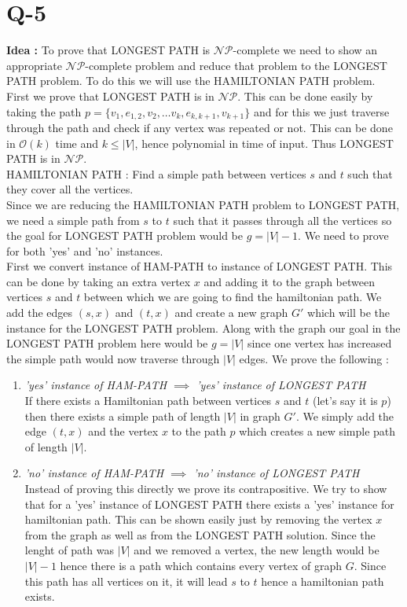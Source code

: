 \documentclass[14pt]{article}
\newcommand{\nonp}{$\mathcal{NP}$}
\begin{document}
 	\section*{Q-5}
 		\noindent
 		\textbf{Idea : }To prove that LONGEST PATH is \nonp-complete we need to show an appropriate \nonp-complete problem and reduce that problem to the LONGEST PATH problem. To do this we will use the HAMILTONIAN PATH problem.\\
 		\newline
 		First we prove that LONGEST PATH is in \nonp. This can be done easily by taking the path $p = \{v_1, e_{1,2}, v_2, \dots v_{k}, e_{k, k+1}, v_{k+1}\}$ and for this we just traverse through the path and check if any vertex was repeated or not. This can be done in $\mathcal{O}(k)$ time and $k \leq |V|$, hence polynomial in time of input. Thus LONGEST PATH is in \nonp.\\
 		HAMILTONIAN PATH : Find a simple path between vertices $s$ and $t$ such that they cover all the vertices.\\
 		Since we are reducing the HAMILTONIAN PATH problem to LONGEST PATH, we need a simple path from $s$ to $t$ such that it passes through all the vertices so the goal for LONGEST PATH problem would be $g = |V|-1$. We need to prove for both 'yes' and 'no' instances.\\
 	   	First we convert instance of HAM-PATH to instance of LONGEST PATH. This can be done by taking an extra vertex $x$ and adding it to the graph between vertices $s$ and $t$ between which we are going to find the hamiltonian path. We add the edges $(s, x)$ and $(t, x)$ and create a new graph $G'$ which will be the instance for the LONGEST PATH problem. Along with the graph our goal in the LONGEST PATH problem here would be $g = |V|$ since one vertex has increased the simple path would now traverse through $|V|$ edges. 
  	    We prove the following :
 		\begin{enumerate}
 			\item \textit{'yes' instance of HAM-PATH $\implies$ 'yes' instance of LONGEST PATH}\\
 			If there exists a Hamiltonian path between vertices $s$ and $t$ (let's say it is $p$) then there exists a simple path of length $|V|$ in graph $G'$. We simply add the edge $(t, x)$ and the vertex $x$ to the path $p$ which creates a new simple path of length $|V|$.
 			
 			\item \textit{'no' instance of HAM-PATH $\implies$ 'no' instance of LONGEST PATH}\\
 			Instead of proving this directly we prove its contrapositive. We try to show that for a 'yes' instance of LONGEST PATH there exists a 'yes' instance for hamiltonian path. This can be shown easily just by removing the vertex $x$ from the graph as well as from the LONGEST PATH solution. Since the lenght of path was $|V|$ and we removed a vertex, the new length would be $|V|-1$ hence there is a path which contains every vertex of graph $G$. Since this path has all vertices on it, it will lead $s$ to $t$ hence a hamiltonian path exists.
 				
 		\end{enumerate}
	
\end{document}
